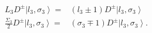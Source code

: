 \begin{equation}
\begin{array}{cc}
L_{3}D^{\pm }\left| l_{3},\sigma _{3}\right\rangle = & \left( l_{3}\pm
1\right) D^{\pm }\left| l_{3},\sigma _{3}\right\rangle \\
\frac{\Sigma _{3}}{2}D^{\pm }\left| l_{3},\sigma _{3}\right\rangle = & \left(
\sigma _{3}\mp 1\right) D^{\pm }\left| l_{3},\sigma _{3}\right\rangle .
\end{array}
\end{equation}

